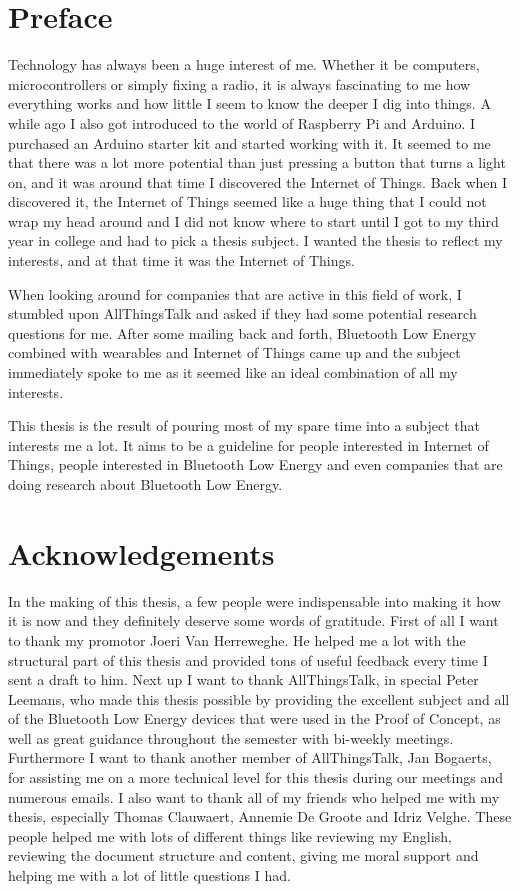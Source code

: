 \documentclass[pdftex,a4paper,12pt,twoside]{report}
\newcommand{\emptypage}{
\newpage
\thispagestyle{empty}
\mbox{}
\newpage
}
\begin{document}
\emptypage

\chapter*{Preface}
\label{ch:preface}
Technology has always been a huge interest of me. Whether it be computers, microcontrollers or simply fixing a radio, it is always fascinating to me how everything works and how little I seem to know the deeper I dig into things. A while ago I also got introduced to the world of Raspberry Pi and Arduino. I purchased an Arduino starter kit and started working with it. It seemed to me that there was a lot more potential than just pressing a button that turns a light on, and it was around that time I discovered the Internet of Things. Back when I discovered it, the Internet of Things seemed like a huge thing that I could not wrap my head around and I did not know where to start until I got to my third year in college and had to pick a thesis subject. I wanted the thesis to reflect my interests, and at that time it was the Internet of Things.

When looking around for companies that are active in this field of work, I stumbled upon AllThingsTalk and asked if they had some potential research questions for me. After some mailing back and forth, Bluetooth Low Energy combined with wearables and Internet of Things came up and the subject immediately spoke to me as it seemed like an ideal combination of all my interests.

This thesis is the result of pouring most of my spare time into a subject that interests me a lot. It aims to be a guideline for people interested in Internet of Things, people interested in Bluetooth Low Energy and even companies that are doing research about Bluetooth Low Energy.


\chapter*{Acknowledgements}
\label{ch:acknowledgements}
In the making of this thesis, a few people were indispensable into making it how it is now and they definitely deserve some words of gratitude. First of all I want to thank my promotor Joeri Van Herreweghe. He helped me a lot with the structural part of this thesis and provided tons of useful feedback every time I sent a draft to him. Next up I want to thank AllThingsTalk, in special Peter Leemans, who made this thesis possible by providing the excellent subject and all of the Bluetooth Low Energy devices that were used in the Proof of Concept, as well as great guidance throughout the semester with bi-weekly meetings. Furthermore I want to thank another member of AllThingsTalk, Jan Bogaerts, for assisting me on a more technical level for this thesis during our meetings and numerous emails. I also want to thank all of my friends who helped me with my thesis, especially Thomas Clauwaert, Annemie De Groote and Idriz Velghe. These people helped me with lots of different things like reviewing my English, reviewing the document structure and content, giving me moral support and helping me with a lot of little questions I had.
\end{document}
